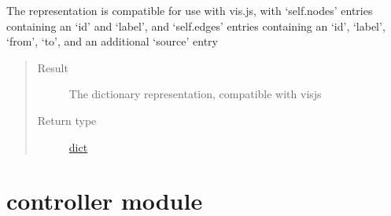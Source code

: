 \documentclass[letterpaper,10pt,english]{sphinxmanual}
\begin{document}
\begin{fulllineitems}
\begin{fulllineitems}
The representation is compatible for use with vis.js, with `self.nodes' entries containing an `id' and `label', and `self.edges' entries containing an `id', `label', `from', `to', and an additional `source' entry
\begin{quote}\begin{description}
\item[{Result}] \leavevmode
The dictionary representation, compatible with visjs

\item[{Return type}] \leavevmode
\href{https://docs.python.org/2/library/stdtypes.html\#dict}{dict}

\end{description}\end{quote}

\end{fulllineitems}


\end{fulllineitems}



\section{controller module}
\label{\detokenize{controller:controller-module}}\label{\detokenize{controller:module-controller}}\label{\detokenize{controller::doc}}
\end{document}
